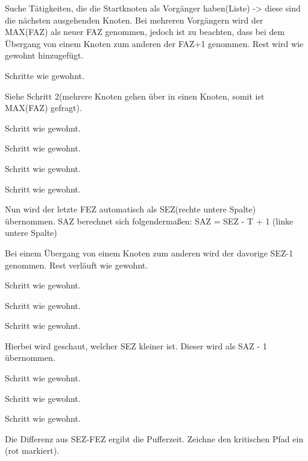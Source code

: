 \documentclass{beamer}
\begin{document}
\begin{frame}[t,shrink=65]
\begin{columns}
\begin{itemize}
{    \item<only@+> {Suche Tätigkeiten, die die Startknoten als Vorgänger haben(Liste) -> diese sind die nächsten ausgehenden Knoten. Bei mehreren Vorgängern wird der MAX(FAZ) als neuer FAZ genommen, jedoch ist zu beachten, dass bei dem Übergang von einem Knoten zum anderen der FAZ+1 genommen. Rest wird wie gewohnt hinzugefügt.}
    \item<only@+> {Schritte wie gewohnt.}
    \item<only@+> {Siehe Schritt 2(mehrere Knoten gehen über in einen Knoten, somit ist MAX(FAZ) gefragt).}
    \item<only@+> {Schritt wie gewohnt.}
    \item<only@+> {Schritt wie gewohnt.}
    \item<only@+> {Schritt wie gewohnt.}
    \item<only@+> {Schritt wie gewohnt.}
    \item<only@+> {Nun wird der letzte FEZ automatisch als SEZ(rechte untere Spalte) übernommen. SAZ berechnet sich folgendermaßen: SAZ = SEZ - T + 1 (linke untere Spalte)}
    \item<only@+> {Bei einem Übergang von einem Knoten zum anderen wird der davorige SEZ-1 genommen. Rest verläuft wie gewohnt.}
    \item<only@+> {Schritt wie gewohnt.}
    \item<only@+> {Schritt wie gewohnt.}
    \item<only@+> {Schritt wie gewohnt.}
    \item<only@+> {Hierbei wird geschaut, welcher SEZ kleiner ist. Dieser wird als SAZ - 1 übernommen.}
    \item<only@+> {Schritt wie gewohnt.}
    \item<only@+> {Schritt wie gewohnt.}
    \item<only@+> {Schritt wie gewohnt.}
    \item<only@+> {Die Differenz aus SEZ-FEZ ergibt die Pufferzeit. Zeichne den kritischen Pfad ein (rot markiert).}
    \item \alert<+> {}
}

\end{itemize}

\par\vspace{0.1cm}\noindent %



\end{columns}

\end{frame}
\end{document}
